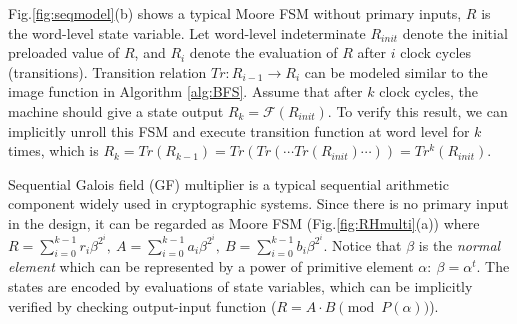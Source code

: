 
Fig.\ref{fig:seqmodel}(b) shows a typical Moore FSM without primary inputs, $R$ is the word-level state variable. Let word-level indeterminate 
$R_{init}$ denote the initial preloaded value of $R$, and $R_{i}$ denote the evaluation of $R$ after $i$ clock cycles
(transitions). Transition relation $Tr:R_{i-1}\to R_i$ can be modeled similar to
the image function in Algorithm \ref{alg:BFS}. Assume that after $k$ clock cycles, the machine should give a state output
$R_{k} = \mathcal F(R_{init})$. To verify this result, we can implicitly unroll this FSM and execute transition
function at word level for $k$ times, which is $R_{k} = Tr(R_{k-1}) = Tr(Tr(\cdots Tr(R_{init})\cdots)) = Tr^k(R_{init})$.

Sequential Galois field (GF) multiplier is a typical sequential arithmetic component widely used in cryptographic systems.
Since there is no primary input in the design, it can be regarded as Moore FSM (Fig.\ref{fig:RHmulti}(a))
where $R = \sum_{i=0}^{k-1} r_i \beta^{2^{i}}, ~A = \sum_{i=0}^{k-1} a_i
 \beta^{2^{i}}, ~B = \sum_{i=0}^{k-1} b_i \beta^{2^{i}}$. Notice that $\beta$ is the {\it normal element}
 which can be represented by a power of primitive element $\alpha:~\beta = \alpha^t$.
The states are encoded by evaluations of state variables, which can be implicitly verified 
by checking output-input function ($R = A\cdot B \pmod{P(\alpha)}$). 


